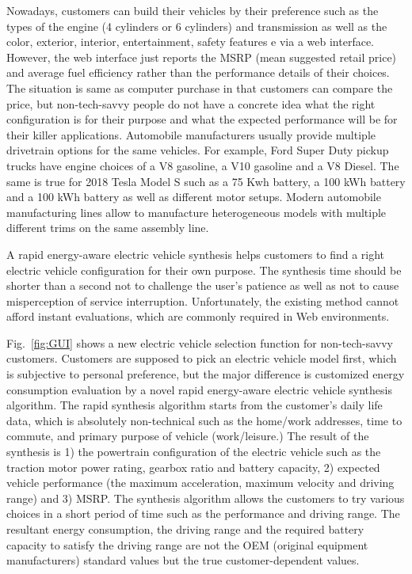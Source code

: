 \documentclass[journal]{IEEEtran}
\begin{document}
Nowadays, customers can build  their  vehicles by their preference such as the types of the engine (4 cylinders or 6 cylinders) and transmission as well as the color, exterior, interior, entertainment, safety features e via a web interface. However, the web interface  just reports  the MSRP (mean suggested retail price) and average fuel efficiency rather than the performance details of their choices. The situation is same as computer purchase in that customers can compare the price, but non-tech-savvy people do not have a concrete idea what the right configuration is for their purpose and what the expected performance will be for their killer applications. 
%
Automobile manufacturers usually provide multiple drivetrain options for the same vehicles. For example, Ford Super Duty pickup trucks have engine choices of a V8 gasoline, a V10 gasoline and a V8 Diesel. The same is true for 2018 Tesla Model S such as a 75 Kwh battery, a 100 kWh battery and a 100 kWh battery as well as different motor setups. Modern automobile manufacturing lines allow to manufacture heterogeneous models with multiple different trims on the same assembly line. 

A rapid energy-aware electric vehicle synthesis helps customers to find a right electric vehicle configuration for their own purpose. The synthesis time should be shorter than a second not to challenge the user’s patience as well as not to cause misperception of service interruption. Unfortunately, the existing method cannot afford instant evaluations, which are commonly required in Web environments. 

Fig.~\ref{fig:GUI} shows a new electric vehicle selection function for non-tech-savvy customers. Customers are supposed to pick an electric vehicle model first, which is subjective to personal preference, but the major difference is customized energy consumption evaluation by a novel rapid energy-aware electric vehicle synthesis algorithm. The rapid synthesis algorithm starts from the customer’s daily life data, which is absolutely non-technical such as the home/work addresses, time to commute, and primary purpose of vehicle (work/leisure.) The result of the synthesis is 1) the powertrain configuration of the electric vehicle such as the traction motor power rating, gearbox ratio and battery capacity, 2) expected vehicle performance (the maximum acceleration, maximum velocity and driving range) and 3) MSRP. The synthesis algorithm allows the customers to try various choices in a short period of time such as the performance and driving range. The resultant energy consumption, the driving range and the required battery capacity to satisfy the driving range are not the OEM (original equipment manufacturers) standard values but the true customer-dependent values. 
\end{document}

